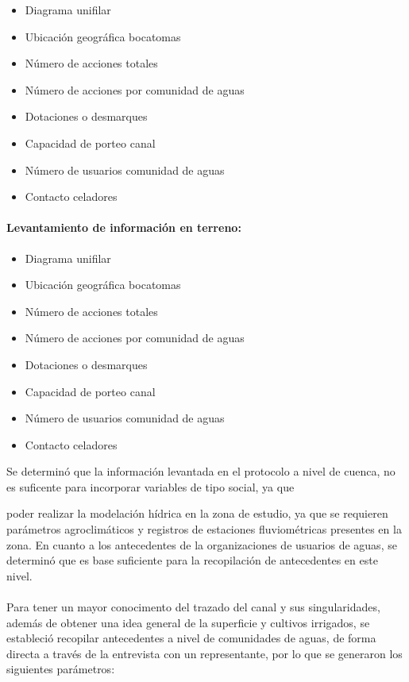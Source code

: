 \documentclass[]{article}
\begin{document}
\begin{itemize}
\item Diagrama unifilar
\item Ubicación geográfica bocatomas
\item Número de acciones totales
\item Número de acciones por comunidad de aguas
\item Dotaciones o desmarques
\item Capacidad de porteo canal
\item Número de usuarios comunidad de aguas
\item Contacto celadores
\end{itemize}

\paragraph{Levantamiento de información en terreno:}

\begin{itemize}
\item Diagrama unifilar
\item Ubicación geográfica bocatomas
\item Número de acciones totales
\item Número de acciones por comunidad de aguas
\item Dotaciones o desmarques
\item Capacidad de porteo canal
\item Número de usuarios comunidad de aguas
\item Contacto celadores
\end{itemize}
Se determinó que la información levantada en el protocolo a nivel de cuenca, no es suficente para incorporar variables de tipo social, ya que 

poder realizar la modelación hídrica en la zona de estudio, ya que se requieren parámetros agroclimáticos y registros de estaciones fluviométricas presentes en la zona. En cuanto a los antecedentes de la organizaciones de usuarios de aguas, se determinó que es base suficiente para la recopilación de antecedentes en este nivel.\\
\\
Para tener un mayor conocimento del trazado del canal y sus singularidades, además de obtener una idea general de la superficie y cultivos irrigados, se estableció recopilar antecedentes a nivel de comunidades de aguas, de forma directa a través de la entrevista con un representante, por lo que se generaron los siguientes parámetros:
\end{document}
